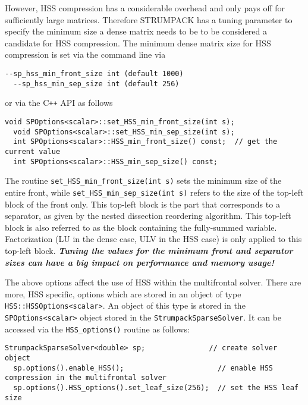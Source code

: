\documentclass{article}
\begin{document}
However, HSS compression has a considerable overhead and only pays off
for sufficiently large matrices. Therefore STRUMPACK has a tuning
parameter to specify the minimum size a dense matrix needs to be to be
considered a candidate for HSS compression. The minimum dense matrix
size for HSS compression is set via the command line via
\begin{lstlisting}[style=Bash]
  --sp_hss_min_front_size int (default 1000)
  --sp_hss_min_sep_size int (default 256)
\end{lstlisting}
or via the C\texttt{++} API as follows
\begin{lstlisting}[style=C]
  void SPOptions<scalar>::set_HSS_min_front_size(int s);
  void SPOptions<scalar>::set_HSS_min_sep_size(int s);
  int SPOptions<scalar>::HSS_min_front_size() const;  // get the current value
  int SPOptions<scalar>::HSS_min_sep_size() const;
\end{lstlisting}
The routine \lstinline[style=C]!set_HSS_min_front_size(int s)! sets
the minimum size of the entire front, while
\lstinline[style=C]!set_HSS_min_sep_size(int s)! refers to the size of
the top-left block of the front only. This top-left block is the part
that corresponds to a separator, as given by the nested dissection
reordering algorithm. This top-left block is also referred to as the
block containing the fully-summed variable. Factorization (LU in the
dense case, ULV in the HSS case) is only applied to this top-left
block. \emph{\textbf{Tuning the values for the minimum front and
    separator sizes can have a big impact on performance and memory
    usage!}}

The above options affect the use of HSS within the multifrontal
solver. There are more, HSS specific, options which are stored in an
object of type \lstinline[style=C]!HSS::HSSOptions<scalar>!. An object
of this type is stored in the \lstinline[style=C]!SPOptions<scalar>!
object stored in the \lstinline[style=C]!StrumpackSparseSolver!. It
can be accessed via the \lstinline[style=C]!HSS_options()! routine as
follows:
\begin{lstlisting}[style=C]
  StrumpackSparseSolver<double> sp;               // create solver object
  sp.options().enable_HSS();                      // enable HSS compression in the multifrontal solver
  sp.options().HSS_options().set_leaf_size(256);  // set the HSS leaf size
\end{lstlisting}
\end{document}
